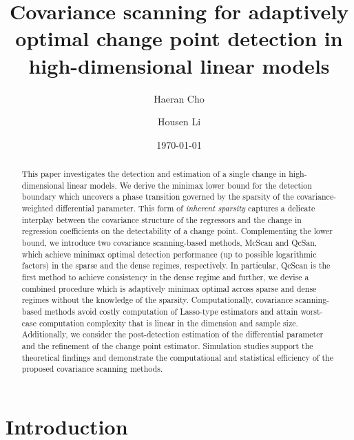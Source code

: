 \documentclass[11pt, a4paper]{article}
\title{Covariance scanning for adaptively optimal change point detection in high-dimensional linear models}
\author{Haeran Cho \and Housen Li}
\date{\today}
\theoremstyle{definition}
\theoremstyle{definition}
\theoremstyle{definition}
\theoremstyle{definition}
\theoremstyle{definition}
\theoremstyle{remark}
\theoremstyle{definition}
\theoremstyle{definition}
\theoremstyle{definition}
\begin{document}
\maketitle

\begin{abstract}
This paper investigates the detection and estimation of a single change in high-dimensional linear models. We derive the minimax lower bound for the detection boundary which uncovers a phase transition governed by the sparsity of the covariance-weighted differential parameter. This form of {\it inherent sparsity} captures a delicate interplay between the covariance structure of the regressors and the change in regression coefficients on the detectability of a change point. Complementing the lower bound, we introduce two covariance scanning-based methods, McScan and QcSan, which achieve minimax optimal detection performance (up to possible logarithmic factors) in the sparse and the dense regimes, respectively. In particular, QcScan is the first method to achieve consistency in the dense regime and further, we devise a combined procedure which is adaptively minimax optimal across sparse and dense regimes without the knowledge of the sparsity. Computationally, covariance scanning-based methods avoid costly computation of Lasso-type estimators and attain worst-case computation complexity that is linear in the dimension and sample size. Additionally, we consider the post-detection estimation of the differential parameter and the refinement of the change point estimator. Simulation studies support the theoretical findings and demonstrate the computational and statistical efficiency of the proposed covariance scanning methods.
\end{abstract}


\section{Introduction}
\end{document}
